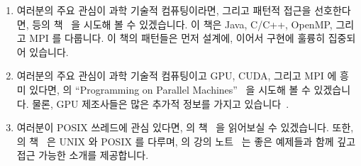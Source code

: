 \begin{enumerate}
\iffalse

\item	If you are interested in an object-oriented patternist
	treatment of parallel programming focussing on C++,
	you might try Volumes~2 and~4 of \pplsur{Douglas C.}{Schmidt}'s POSA
	series~\cite{SchmidtStalRohnertBuschmann2000v2Textbook,
	BuschmannHenneySchmidt2007v4Textbook}.
	Volume~4 in particular has some interesting chapters
	applying this work to a warehouse application.
	The realism of this example is attested to by
	the section entitled ``Partitioning the Big Ball of Mud'',
	in which the problems inherent in parallelism often take a back
	seat to getting one's head around a real-world application.
\item	If you want to work with Linux-kernel device drivers,
	then \pplsur{Jonathan}{Corbet}'s, \pplsur{Alessandro}{Rubini}'s,
	and \pplsur{Greg}{Kroah-Hartman}'s
	``Linux Device Drivers''~\cite{CorbetRubiniKroahHartman}
	is indispensable, as is the Linux Weekly News web site
	(\url{https://lwn.net/}).
	There is a large number of books and resources on
	the more general topic of Linux kernel internals.

\fi

\item	여러분의 주요 관심이 과학 기술적 컴퓨팅이라면, 그리고 패턴적 접근을
	선호한다면,  등의
	책~\cite{Mattson2005Textbook} 을 시도해 볼 수 있겠습니다.
	이 책은 Java, C/C++, OpenMP, 그리고 MPI 를 다룹니다\@.
	이 책의 패턴들은 먼저 설계에, 이어서 구현에 훌륭히 집중되어 있습니다.
\item	여러분의 주요 관심이 과학 기술적 컴퓨팅이고 GPU, CUDA, 그리고 MPI 에
	흥미 있다면,  의 ``Programming on Parallel
	Machines''~\cite{NormMatloff2017ParProcBook} 을 시도해 볼 수
	있겠습니다.  물론, GPU 제조사들은 많은 추가적 정보를 가지고
	있습니다~\cite{AMD2020ROCm,CyrilZeller2011GPGPUbasics,NVidia2017GPGPU,NVidia2017GPGPU-university}.
\item	여러분이 POSIX 쓰레드에 관심 있다면,  의
	책~\cite{Butenhof1997pthreads} 을 읽어보실 수 있겠습니다.
	또한,  의
	책~\cite{WRichardStevens1992,WRichardStevens2013} 은 UNIX 와 POSIX 를
	다루며,  의 강의 노트~\cite{StewartWeiss2013UNIX}
	는 좋은 예제들과 함께 깊고 접근 가능한 소개를 제공합니다.

\iffalse


\end{enumerate}
